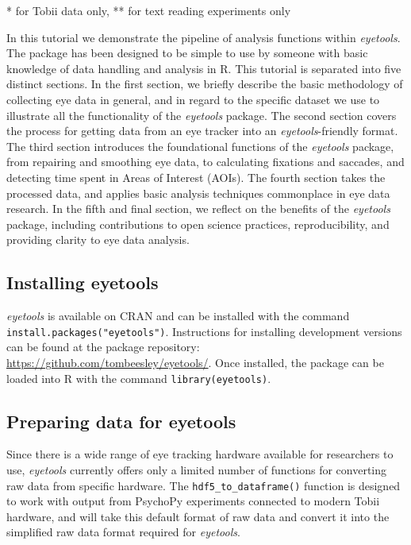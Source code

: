 \documentclass[
  man,
  floatsintext,
  longtable,
  nolmodern,
  notxfonts,
  notimes,
  colorlinks=true,linkcolor=blue,citecolor=blue,urlcolor=blue]{apa7}
\begin{document}
* for Tobii data only, ** for text reading experiments only

In this tutorial we demonstrate the pipeline of analysis functions
within \emph{eyetools}. The package has been designed to be simple to
use by someone with basic knowledge of data handling and analysis in R.
This tutorial is separated into five distinct sections. In the first
section, we briefly describe the basic methodology of collecting eye
data in general, and in regard to the specific dataset we use to
illustrate all the functionality of the \emph{eyetools} package. The
second section covers the process for getting data from an eye tracker
into an \emph{eyetools}-friendly format. The third section introduces
the foundational functions of the \emph{eyetools} package, from
repairing and smoothing eye data, to calculating fixations and saccades,
and detecting time spent in Areas of Interest (AOIs). The fourth section
takes the processed data, and applies basic analysis techniques
commonplace in eye data research. In the fifth and final section, we
reflect on the benefits of the \emph{eyetools} package, including
contributions to open science practices, reproducibility, and providing
clarity to eye data analysis.

\subsection{Installing eyetools}\label{installing-eyetools}

\emph{eyetools} is available on CRAN and can be installed with the
command \texttt{install.packages("eyetools")}. Instructions for
installing development versions can be found at the package repository:
\url{https://github.com/tombeesley/eyetools/}. Once installed, the
package can be loaded into R with the command
\texttt{library(eyetools)}.

\subsection{Preparing data for
eyetools}\label{preparing-data-for-eyetools}

Since there is a wide range of eye tracking hardware available for
researchers to use, \emph{eyetools} currently offers only a limited
number of functions for converting raw data from specific hardware. The
\texttt{hdf5\_to\_dataframe()} function is designed to work with output
from PsychoPy experiments connected to modern Tobii hardware, and will
take this default format of raw data and convert it into the simplified
raw data format required for \emph{eyetools}.
\end{document}
